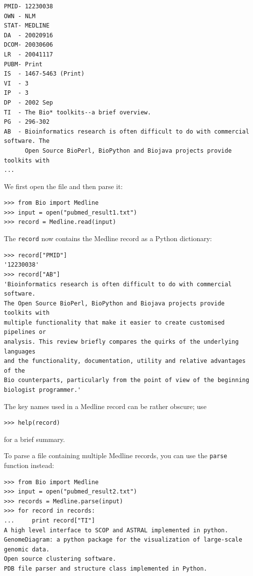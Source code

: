 \documentclass{report}
\begin{document}
\begin{verbatim}
PMID- 12230038
OWN - NLM
STAT- MEDLINE
DA  - 20020916
DCOM- 20030606
LR  - 20041117
PUBM- Print
IS  - 1467-5463 (Print)
VI  - 3
IP  - 3
DP  - 2002 Sep
TI  - The Bio* toolkits--a brief overview.
PG  - 296-302
AB  - Bioinformatics research is often difficult to do with commercial software. The
      Open Source BioPerl, BioPython and Biojava projects provide toolkits with
...
\end{verbatim}
We first open the file and then parse it:
\begin{verbatim}
>>> from Bio import Medline
>>> input = open("pubmed_result1.txt")
>>> record = Medline.read(input)
\end{verbatim}
The \verb+record+ now contains the Medline record as a Python dictionary:
\begin{verbatim}
>>> record["PMID"]
'12230038'
>>> record["AB"]
'Bioinformatics research is often difficult to do with commercial software.
The Open Source BioPerl, BioPython and Biojava projects provide toolkits with
multiple functionality that make it easier to create customised pipelines or
analysis. This review briefly compares the quirks of the underlying languages
and the functionality, documentation, utility and relative advantages of the
Bio counterparts, particularly from the point of view of the beginning
biologist programmer.'
\end{verbatim}
The key names used in a Medline record can be rather obscure; use
\begin{verbatim}
>>> help(record)
\end{verbatim}
for a brief summary.

To parse a file containing multiple Medline records, you can use the \verb+parse+ function instead:
\begin{verbatim}
>>> from Bio import Medline
>>> input = open("pubmed_result2.txt")
>>> records = Medline.parse(input)
>>> for record in records:
...     print record["TI"]
A high level interface to SCOP and ASTRAL implemented in python.
GenomeDiagram: a python package for the visualization of large-scale genomic data.
Open source clustering software.
PDB file parser and structure class implemented in Python.
\end{verbatim}
\end{document}
